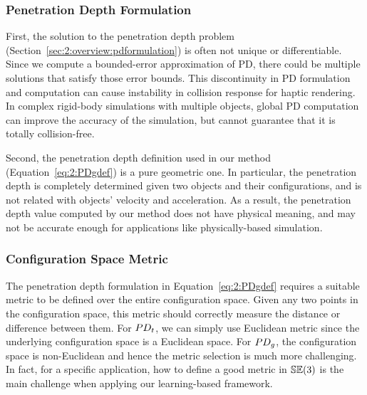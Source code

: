 \subsubsection{Penetration Depth Formulation}

First, the solution to the penetration depth problem (Section~\ref{sec:2:overview:pdformulation}) is often not unique or differentiable. Since we compute a bounded-error approximation of PD, there could be multiple solutions that satisfy those error bounds. This discontinuity in PD formulation and computation can cause instability in collision response for haptic rendering. In complex rigid-body simulations with multiple objects, global PD computation can improve the accuracy of the simulation, but cannot guarantee that it is totally collision-free.

Second, the penetration depth definition used in our method (Equation~\ref{eq:2:PDgdef}) is a pure geometric one. In particular, the penetration depth is completely determined given two objects and their configurations, and is not related with objects' velocity and acceleration. As a result, the penetration depth value computed by our method does not have physical meaning, and may not be accurate enough for applications like physically-based simulation.

\subsubsection{Configuration Space Metric}
The penetration depth formulation in Equation~\ref{eq:2:PDgdef} requires a suitable metric to be defined over the entire configuration space. Given any two points in the configuration space, this metric should correctly measure the distance or difference between them.  
For $PD_t$, we can simply use Euclidean metric since the underlying configuration space is a Euclidean space. 
For $PD_g$, the configuration space is non-Euclidean and hence the metric selection is much more challenging. In fact, for a specific application, how to define a good metric in $\mathbb {SE}(3)$ is the main challenge when applying our learning-based framework. 

